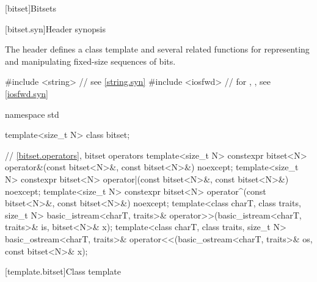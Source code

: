 [bitset]{Bitsets}
%

[bitset.syn]{Header  synopsis}%

\pnum
The header  defines a class template
and several related functions for representing
and manipulating fixed-size sequences of bits.

\begin{codeblock}
#include <string>   // see \ref{string.syn}
#include <iosfwd>   // for , , see \ref{iosfwd.syn}

namespace std {
  template<size_t N> class bitset;

  // \ref{bitset.operators}, bitset operators
  template<size_t N>
    constexpr bitset<N> operator&(const bitset<N>&, const bitset<N>&) noexcept;
  template<size_t N>
    constexpr bitset<N> operator|(const bitset<N>&, const bitset<N>&) noexcept;
  template<size_t N>
    constexpr bitset<N> operator^(const bitset<N>&, const bitset<N>&) noexcept;
  template<class charT, class traits, size_t N>
    basic_istream<charT, traits>&
      operator>>(basic_istream<charT, traits>& is, bitset<N>& x);
  template<class charT, class traits, size_t N>
    basic_ostream<charT, traits>&
      operator<<(basic_ostream<charT, traits>& os, const bitset<N>& x);
}
\end{codeblock}

[template.bitset]{Class template }%

